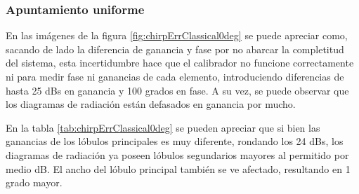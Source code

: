 \subsubsection{Apuntamiento uniforme}

En las imágenes de la figura \ref{fig:chirpErrClassical0deg} se puede apreciar como, sacando de lado la diferencia de 
ganancia y fase por no abarcar la completitud del sistema, esta incertidumbre hace que el calibrador no funcione correctamente 
ni para medir fase ni ganancias de cada elemento, introduciendo diferencias de hasta 25 dBs en ganancia y 100 grados en fase.
A su vez, se puede observar que los diagramas de radiación están defasados en ganancia por mucho.

En la tabla \ref{tab:chirpErrClassical0deg} se pueden apreciar que si bien las ganancias de los lóbulos principales es muy 
diferente, rondando los 24 dBs, los diagramas de radiación ya poseen lóbulos segundarios mayores al permitido por medio dB. El 
ancho del lóbulo principal también se ve afectado, resultando en 1 grado mayor.

